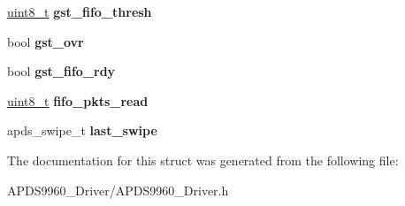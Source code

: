 \begin{DoxyCompactItemize}
\hyperlink{vl53l0x__types_8h_aba7bc1797add20fe3efdf37ced1182c5}{uint8\+\_\+t} {\bfseries gst\+\_\+fifo\+\_\+thresh}
\item 
\mbox{\label{structAPDS9960__GST__Settings_a714c2766496a3ed08fe1621ba9403905}} 
bool {\bfseries gst\+\_\+ovr}
\item 
\mbox{\label{structAPDS9960__GST__Settings_a81de6373bbe66c6d15c2c968c222201d}} 
bool {\bfseries gst\+\_\+fifo\+\_\+rdy}
\item 
\mbox{\label{structAPDS9960__GST__Settings_aeee3d433e79e039a2eaaa91abe6c237a}} 
\hyperlink{vl53l0x__types_8h_aba7bc1797add20fe3efdf37ced1182c5}{uint8\+\_\+t} {\bfseries fifo\+\_\+pkts\+\_\+read}
\item 
\mbox{\label{structAPDS9960__GST__Settings_aaab006b6a7717d09c505eed74cd1f7d4}} 
apds\+\_\+swipe\+\_\+t {\bfseries last\+\_\+swipe}
\end{DoxyCompactItemize}


The documentation for this struct was generated from the following file\+:\begin{DoxyCompactItemize}
\item 
A\+P\+D\+S9960\+\_\+\+Driver/A\+P\+D\+S9960\+\_\+\+Driver.\+h\end{DoxyCompactItemize}
